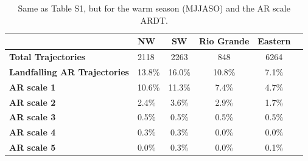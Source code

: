 \documentclass[draft,jgrga]{agutexSI2019}
\begin{document}
\begin{article}
\begin{table}
\caption{ Same as Table S1, but for the warm season (MJJASO) and the AR scale ARDT.}
\label{table:MJJASOar_scale}
\begin{tabular}{lp{2cm}cccc}
\toprule
 & NW & SW & Rio Grande & Eastern \\
\midrule
\textbf{Total Trajectories} & 2118 & 2263 & 848 & 6264 \\
\textbf{Landfalling AR Trajectories} & 13.8\% & 16.0\% & 10.8\% & 7.1\% \\
\textbf{AR scale 1} & 10.6\% & 11.3\% & 7.4\% & 4.7\% \\
\textbf{AR scale 2} & 2.4\% & 3.6\% & 2.9\% & 1.7\% \\
\textbf{AR scale 3} & 0.5\% & 0.5\% & 0.5\% & 0.5\% \\
\textbf{AR scale 4} & 0.3\% & 0.3\% & 0.0\% & 0.0\% \\
\textbf{AR scale 5} & 0.0\% & 0.3\% & 0.0\% & 0.1\% \\
\bottomrule
\end{tabular}
\end{table}




%




\end{article}
\end{document}
